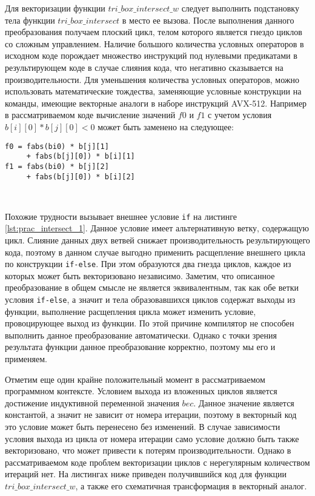 \documentclass[
11pt,%
tightenlines,%
twoside,%
onecolumn,%
nofloats,%
nobibnotes,%
nofootinbib,%
superscriptaddress,%
noshowpacs,%
centertags]%
{revtex4}
\begin{document}
Для векторизации функции $tri\_box\_intersect\_w$ следует выполнить подстановку тела функции $tri\_box\_intersect$ в место ее вызова.
После выполнения данного преобразования получаем плоский цикл, телом которого является гнездо циклов со сложным управлением.
Наличие большого количества условных операторов в исходном коде порождает множество инструкций под нулевыми предикатами в результирующем коде в случае слияния кода, что негативно сказывается на производительности.
Для уменьшения количества условных операторов, можно использовать математические тождества, заменяющие условные конструкции на команды, имеющие векторные аналоги в наборе инструкций AVX-512.
Например в рассматриваемом коде вычисление значений $f0$ и $f1$ с учетом условия $b[i][0] * b[j][0] < 0$ может быть заменено на следующее:

\begin{lstlisting}[caption={Применение тождеств для использования векторных инструкций.},label={lst:prac_intersect_16_2}]
f0 = fabs(bi0) * b[j][1]
     + fabs(b[j][0]) * b[i][1]
f1 = fabs(bi0) * b[j][2]
     + fabs(b[j][0]) * b[i][2]
\end{lstlisting}

\

Похожие трудности вызывает внешнее условие \texttt{if} на листинге \ref{lst:prac_intersect_1}.
Данное условие имеет альтернативную ветку, содержащую цикл.
Слияние данных двух ветвей снижает производительность результирующего кода, поэтому в данном случае выгодно применить расщепление внешнего цикла по конструкции \texttt{if-else}.
При этом образуются два гнезда циклов, каждое из которых может быть векторизовано независимо.
Заметим, что описанное преобразование в общем смысле не является эквивалентным, так как обе ветки условия \texttt{if-else}, а значит и тела образовавшихся циклов содержат выходы из функции, выполнение расщепления цикла может изменить условие, провоцирующее выход из функции.
По этой причине компилятор не способен выполнить данное преобразование автоматически.
Однако с точки зрения результата функции данное преобразование корректно, поэтому мы его и применяем.

Отметим еще один крайне положительный момент в рассматриваемом программном контексте.
Условием выхода из вложенных циклов является достижение индуктивной переменной значения $bec$.
Данное значение является константой, а значит не зависит от номера итерации, поэтому в векторный код это условие может быть перенесено без изменений.
В случае зависимости условия выхода из цикла от номера итерации само условие должно быть также векторизовано, что может привести к потерям производительности.
Однако в рассматриваемом коде проблем векторизации циклов с нерегулярным количеством итераций нет.
На листингах ниже приведен получившийся код для функции $tri\_box\_intersect\_w$, а также его схематичная трансформация в векторный аналог.
\end{document}
